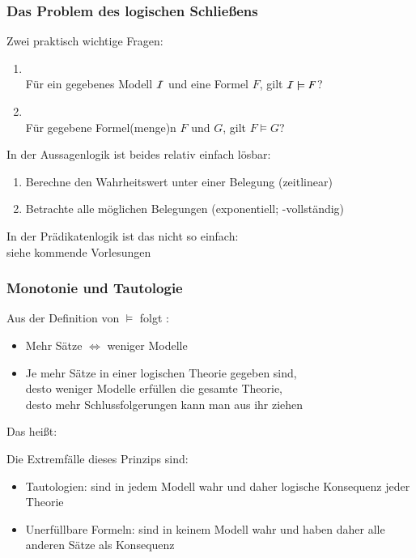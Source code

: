 \documentclass[aspectratio=1610,onlymath]{beamer}
\begin{document}
\begin{frame}\frametitle{Das Problem des logischen Schließens}

Zwei praktisch wichtige Fragen:
\begin{enumerate}[(1)]
\item {}\\ Für ein gegebenes Modell $\mathcal{I}$ und eine Formel $F$, gilt $\mathcal{I}\models F$?
\item {}\\ Für gegebene Formel(menge)n $F$ und $G$, gilt $F\models G$?
\end{enumerate}\pause\bigskip

\alert{In der Aussagenlogik} ist beides relativ einfach lösbar:
\begin{enumerate}[(1)]
\item Berechne den Wahrheitswert unter einer Belegung (zeitlinear)
\item Betrachte alle möglichen Belegungen (exponentiell; -vollständig)
\end{enumerate}\pause\bigskip

\alert{In der Prädikatenlogik} ist das nicht so einfach:\\ siehe kommende Vorlesungen

\end{frame}

\begin{frame}\frametitle{Monotonie und Tautologie}

Aus der Definition von $\models$ folgt :
\begin{itemize}
\item Mehr Sätze $\Leftrightarrow$ weniger Modelle
\item Je \alert{mehr Sätze} in einer logischen Theorie gegeben sind,\\
	desto \alert{weniger Modelle} erfüllen die gesamte Theorie,\\
	desto \alert{mehr Schlussfolgerungen} kann man aus ihr ziehen
\end{itemize}
Das heißt: 
\bigskip\pause

Die Extremfälle dieses Prinzips sind:
\begin{itemize}
\item \alert{Tautologien:} sind in jedem Modell wahr und daher logische Konsequenz jeder Theorie
\item \alert{Unerfüllbare Formeln:} sind in keinem Modell wahr und haben daher alle anderen Sätze als Konsequenz
\end{itemize}

\end{frame}
\end{document}
